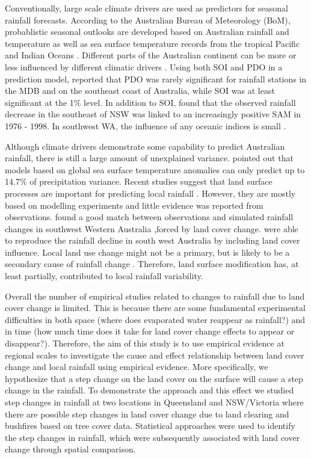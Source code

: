 \documentclass[draft,linenumbers]{agujournal}
\begin{document}
\begin{article}
Conventionally, large scale climate drivers are used as predictors for seasonal rainfall forecasts. According to the Australian Bureau of Meteorology (BoM), probablistic seasonal outlooks are developed based on Australian rainfall and temperature as well as sea surface temperature records from the tropical Pacific and Indian Oceans \citep{BoM2012c}. 
Different parts of the Australian continent can be more or less influenced by different climatic drivers \citep{Mla2008}. Using both SOI and PDO in a prediction model, \citet{Kamruzzaman2011} reported that PDO was rarely significant for rainfall stations in the MDB and on the southeast coast of Australia, while SOI was at least significant at the 1\% level. In addition to SOI, \citet{Speer2011} found that the observed rainfall decrease in the southeast of NSW was linked to an increasingly positive SAM in 1976 - 1998. In southwest WA, the influence of any oceanic indices is small \citep{Smith2012}.

Although climate drivers demonstrate some capability to predict Australian rainfall, there is still a large amount of unexplained variance. \citet{Westra2010} pointed out that models based on global sea surface temperature anomalies can only predict up to 14.7\% of precipitation variance. Recent studies suggest that land surface processes are important for predicting local rainfall \citep[e.g.][]{Ma2011,Zeng2012, pitman_scale_2016, saha_investigating_2016}. However, they are mostly based on modelling experiments and little evidence was reported from observations. \citet{Pitman2004} found a good match between observations and simulated rainfall changes in southwest Western Australia ,forced by land cover change. \citet{Timbal2006} were able to reproduce the rainfall decline in south west Australia by including land cover influence. Local land use change might not be a primary, but is likely to be a secondary cause of rainfall change \citep{Nicholls2006}. Therefore, land surface modification has, at least partially, contributed to local rainfall variability.

Overall the number of empirical studies related to changes to rainfall due to land cover change is limited. This is because there are some fundamental experimental difficulties in both space (where does evaporated water reappear as rainfall?) and in time (how much time does it take for land cover change effects to appear or disappear?). Therefore, the aim of this study is to use empirical evidence at regional scales to investigate the cause and effect relationship between land cover change and local rainfall using empirical evidence. More specifically, we hypothesize that a step change on the land cover on the surface will cause a step change in the rainfall. To demonstrate the approach and this effect we studied step changes in rainfall at two locations in Queensland and NSW/Victoria where there are possible step changes in land cover change due to land clearing and bushfires based on tree cover data. Statistical approaches were used to identify the step changes in rainfall, which were subsequently associated with land cover change through spatial comparison.


\end{article}
\end{document}
